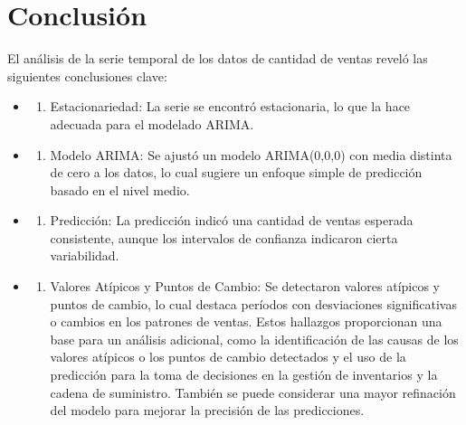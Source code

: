 \documentclass[
]{book}
\providecommand{\tightlist}{%
  \setlength{\itemsep}{0pt}\setlength{\parskip}{0pt}}
\begin{document}
\section{Conclusión}\label{conclusiuxf3n-1}

El análisis de la serie temporal de los datos de cantidad de ventas reveló las siguientes conclusiones clave:

\begin{itemize}
\tightlist
\item
  \begin{enumerate}
  \def\labelenumi{\arabic{enumi}.}
  \tightlist
  \item
    Estacionariedad: La serie se encontró estacionaria, lo que la hace adecuada para el modelado ARIMA.
  \end{enumerate}
\item
  \begin{enumerate}
  \def\labelenumi{\arabic{enumi}.}
  \setcounter{enumi}{1}
  \tightlist
  \item
    Modelo ARIMA: Se ajustó un modelo ARIMA(0,0,0) con media distinta de cero a los datos, lo cual sugiere un enfoque simple de predicción basado en el nivel medio.
  \end{enumerate}
\item
  \begin{enumerate}
  \def\labelenumi{\arabic{enumi}.}
  \setcounter{enumi}{2}
  \tightlist
  \item
    Predicción: La predicción indicó una cantidad de ventas esperada consistente, aunque los intervalos de confianza indicaron cierta variabilidad.
  \end{enumerate}
\item
  \begin{enumerate}
  \def\labelenumi{\arabic{enumi}.}
  \setcounter{enumi}{3}
  \tightlist
  \item
    Valores Atípicos y Puntos de Cambio: Se detectaron valores atípicos y puntos de cambio, lo cual destaca períodos con desviaciones significativas o cambios en los patrones de ventas.
    Estos hallazgos proporcionan una base para un análisis adicional, como la identificación de las causas de los valores atípicos o los puntos de cambio detectados y el uso de la predicción para la toma de decisiones en la gestión de inventarios y la cadena de suministro. También se puede considerar una mayor refinación del modelo para mejorar la precisión de las predicciones.
  \end{enumerate}
\end{itemize}

  
\end{document}
